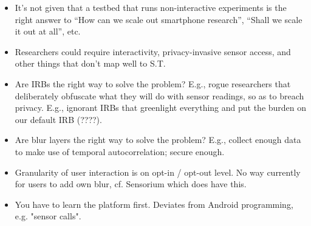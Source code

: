 \begin{itemize}
  \item It's not given that a testbed that runs non-interactive 
experiments is the right answer to ``How can we scale out 
smartphone research'', ``Shall we scale it out at all'', etc.
  \item Researchers could require interactivity, privacy-invasive 
sensor access, and other things that don't map well to S.T.
  \item Are IRBs the right way to solve the problem? E.g., 
rogue researchers that deliberately obfuscate what they will 
do with sensor readings, so as to breach privacy. E.g., 
ignorant IRBs that greenlight everything and put the burden on 
our default IRB (????).
  \item Are blur layers the right way to solve the problem? E.g., 
collect enough data to make use of temporal autocorrelation; secure enough.
  \item Granularity of user interaction is on opt-in / opt-out 
level. No way currently for users to add own blur, cf. Sensorium 
which does have this.
  \item You have to learn the platform first. Deviates from Android programming, e.g. "sensor calls".
\end{itemize}
